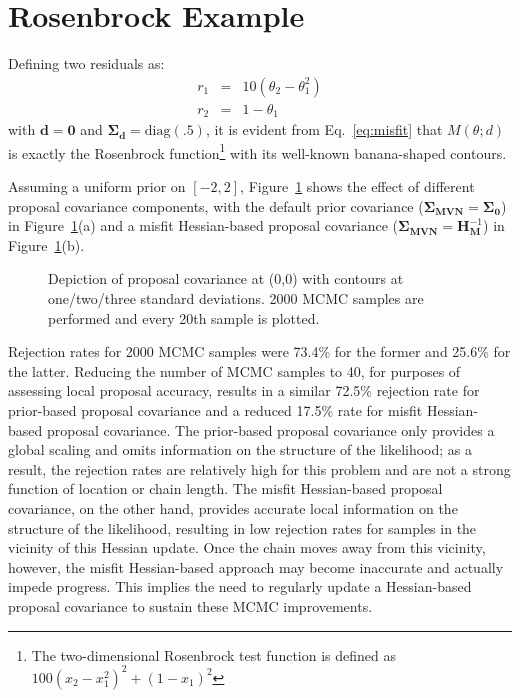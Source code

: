 \section{Rosenbrock Example} \label{uq:bayes:ex}

Defining two residuals as:
\begin{eqnarray}
r_1 &=& 10 (\theta_2 - \theta_1^2) \label{eq:rosen_r1} \\
r_2 &=& 1 - \theta_1 \label{eq:rosen_r2}
\end{eqnarray}
with $\boldsymbol{d} = \boldsymbol{0}$ and $\boldsymbol{\Sigma_d} =
\text{diag}(\boldsymbol{.5})$, it is evident from Eq.~\ref{eq:misfit}
that $M(\theta;d)$ is exactly the Rosenbrock function\footnote{The
  two-dimensional Rosenbrock test function is defined as $100 (x_2 -
  x_1^2)^2 + (1 - x_1)^2$} with its well-known banana-shaped contours.

Assuming a uniform prior on $[-2,2]$,
Figure~\ref{fig:rosen_prop_covar} shows the effect of different
proposal covariance components, with the default prior covariance 
($\boldsymbol{\Sigma_{MVN}} = \boldsymbol{\Sigma_0}$) in
Figure~\ref{fig:rosen_prop_covar}(a) and a misfit Hessian-based
proposal covariance 
($\boldsymbol{\Sigma_{MVN}} = \boldsymbol{H}_{\boldsymbol{M}}^{-1}$) 
in Figure~\ref{fig:rosen_prop_covar}(b).
\begin{figure}[htbp]
  \begin{subfigmatrix}{2}
  \end{subfigmatrix}
  \caption{Depiction of proposal covariance at (0,0) with contours at one/two/three standard deviations.  2000 MCMC samples are performed and every 20th sample is plotted.}
\label{fig:rosen_prop_covar}
\end{figure}
Rejection rates for 2000 MCMC samples were 73.4\% for the former and
25.6\% for the latter.  Reducing the number of MCMC samples to 40, for
purposes of assessing local proposal accuracy, results in a similar
72.5\% rejection rate for prior-based proposal covariance and a
reduced 17.5\% rate for misfit Hessian-based proposal covariance.  The
prior-based proposal covariance only provides a global scaling and
omits information on the structure of the likelihood; as a result, the
rejection rates are relatively high for this problem and are not a
strong function of location or chain length.  The misfit Hessian-based
proposal covariance, on the other hand, provides accurate local
information on the structure of the likelihood, resulting in low
rejection rates for samples in the vicinity of this Hessian update.
Once the chain moves away from this vicinity, however, the misfit
Hessian-based approach may become inaccurate and actually impede
progress. This implies the need to regularly update a Hessian-based
proposal covariance to sustain these MCMC improvements.


